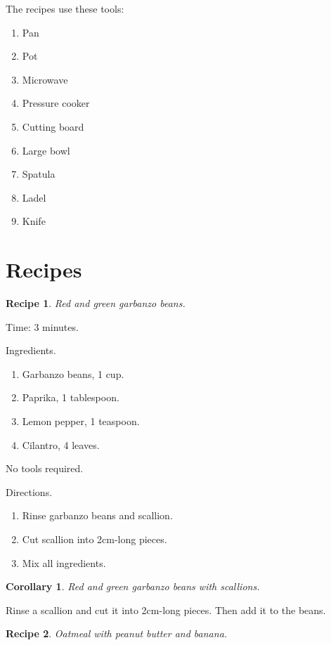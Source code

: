 \documentclass[twocolumn]{amsart}
\newtheorem{rec}{Recipe}
\newtheorem{cor}{Corollary}
\begin{document}
The recipes use these tools:
\begin{enumerate}
	\item Pan
	\item Pot
	\item Microwave
	\item Pressure cooker
	\item Cutting board
	\item Large bowl
	\item Spatula
	\item Ladel
	\item Knife
\end{enumerate}

\section{Recipes}

\begin{rec} Red and green garbanzo beans. \end{rec}

Time: 3 minutes.

Ingredients.
\begin{enumerate}
	\item Garbanzo beans, 1 cup.
	\item Paprika, 1 tablespoon.
	\item Lemon pepper, 1 teaspoon.
	\item Cilantro, 4 leaves.
\end{enumerate}

No tools required.

Directions.
\begin{enumerate}
	\item Rinse garbanzo beans and scallion.
	\item Cut scallion into 2cm-long pieces.
	\item Mix all ingredients.
\end{enumerate}

\vspace{1em}
\begin{cor} Red and green garbanzo beans with scallions. \end{cor}

Rinse a scallion and cut it into 2cm-long pieces. Then add it to
the beans.

\vspace{3em}

\begin{rec} Oatmeal with peanut butter and banana. \end{rec}
\end{document}
